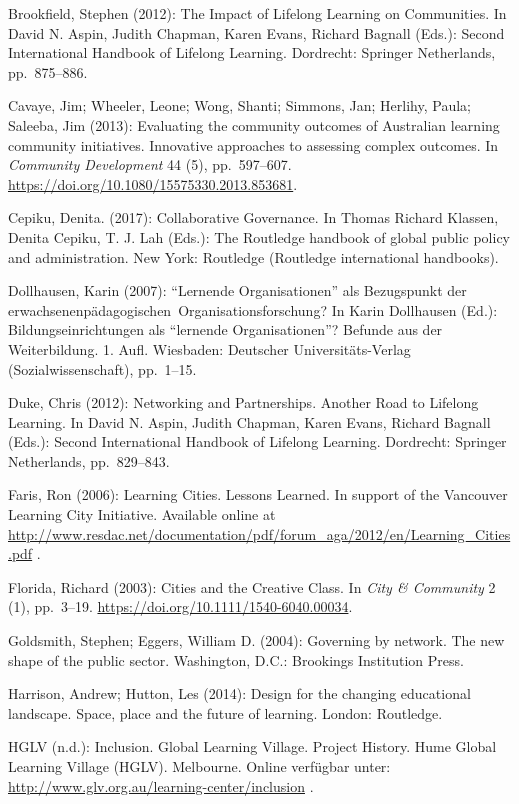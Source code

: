 \documentclass[a4paper,
fontsize=11pt,
oneside,
numbers=noperiodatend,
parskip=half-,
bibliography=totoc,
final
]{scrartcl}
\begin{document}
Brookfield, Stephen (2012): The Impact of Lifelong Learning on
Communities. In David N. Aspin, Judith Chapman, Karen Evans, Richard
Bagnall (Eds.): Second International Handbook of Lifelong Learning.
Dordrecht: Springer Netherlands, pp.~875--886.

Cavaye, Jim; Wheeler, Leone; Wong, Shanti; Simmons, Jan; Herlihy, Paula;
Saleeba, Jim (2013): Evaluating the community outcomes of Australian
learning community initiatives. Innovative approaches to assessing
complex outcomes. In \emph{Community Development} 44 (5), pp.~597--607.
\url{https://doi.org/10.1080/15575330.2013.853681}.

Cepiku, Denita. (2017): Collaborative Governance. In Thomas Richard
Klassen, Denita Cepiku, T. J. Lah (Eds.): The Routledge handbook of
global public policy and administration. New York: Routledge (Routledge
international handbooks).

Dollhausen, Karin (2007): \enquote{Lernende Organisationen} als
Bezugspunkt der erwachsenenpädagogischen~Organisationsforschung? In
Karin Dollhausen (Ed.): Bildungseinrichtungen als \enquote{lernende
Organisationen}? Befunde aus der Weiterbildung. 1. Aufl. Wiesbaden:
Deutscher Universitäts-Verlag (Sozialwissenschaft), pp.~1--15.

Duke, Chris (2012): Networking and Partnerships. Another Road to
Lifelong Learning. In David N. Aspin, Judith Chapman, Karen Evans,
Richard Bagnall (Eds.): Second International Handbook of Lifelong
Learning. Dordrecht: Springer Netherlands, pp.~829--843.

Faris, Ron (2006): Learning Cities. Lessons Learned. In support of the
Vancouver Learning City Initiative. Available online at
\url{http://www.resdac.net/documentation/pdf/forum_aga/2012/en/Learning_Cities.pdf}
.

Florida, Richard (2003): Cities and the Creative Class. In \emph{City \&
Community} 2 (1), pp.~3--19.
\url{https://doi.org/10.1111/1540-6040.00034}.

Goldsmith, Stephen; Eggers, William D. (2004): Governing by network. The
new shape of the public sector. Washington, D.C.: Brookings Institution
Press.

Harrison, Andrew; Hutton, Les (2014): Design for the changing
educational landscape. Space, place and the future of learning. London:
Routledge.

HGLV (n.d.): Inclusion. Global Learning Village. Project History. Hume
Global Learning Village (HGLV). Melbourne. Online verfügbar unter:
\url{http://www.glv.org.au/learning-center/inclusion} .
\end{document}
